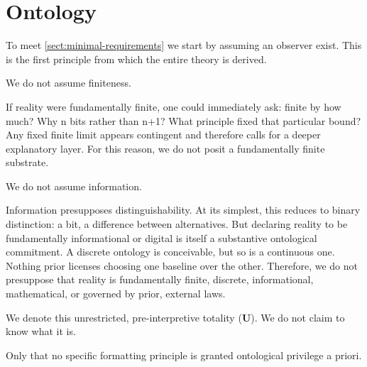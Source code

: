
\section{Ontology}
\label{sect:ontology}

To meet \ref{sect:minimal-requirements} we start by assuming an observer exist. This is the first principle from which
the entire theory is derived. 

We do not assume finiteness.

If reality were fundamentally finite, one could immediately ask: finite by how much? Why n bits rather than n+1?
What principle fixed that particular bound?
Any fixed finite limit appears contingent and therefore calls for a deeper explanatory layer.
For this reason, we do not posit a fundamentally finite substrate.

We do not assume information.

Information presupposes distinguishability. At its simplest, this reduces to binary distinction: a bit, a difference between alternatives.
But declaring reality to be fundamentally informational or digital is itself a substantive ontological commitment.
A discrete ontology is conceivable, but so is a continuous one. Nothing prior licenses choosing one baseline over the other.
Therefore, we do not presuppose that reality is fundamentally finite, discrete, informational, mathematical, or governed by prior, external laws.

We denote this unrestricted, pre-interpretive totality ($\mathbf{U}$). We do not claim to know what it is.

Only that no specific formatting principle is granted ontological privilege a priori.



